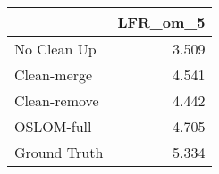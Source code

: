 \begin{tabular}{lr}
\toprule
{} & LFR_om_5 \\
\midrule
No Clean Up  &    3.509 \\
Clean-merge  &    4.541 \\
Clean-remove &    4.442 \\
OSLOM-full   &    4.705 \\
Ground Truth &    5.334 \\
\bottomrule
\end{tabular}

